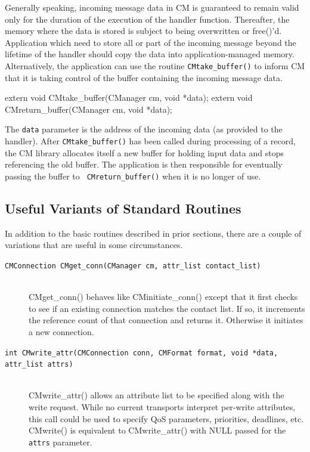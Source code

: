 \documentclass[11pt]{article}
\begin{document}
Generally speaking, incoming message data in CM is guaranteed to remain
valid only for the duration of the execution of the handler function.
Thereafter, the memory where the data is stored is subject to being
overwritten or free()'d.  Application which need to store all or part of the
incoming message beyond the lifetime of the handler should copy the
data into application-managed memory.   Alternatively, the application can
use the routine {\tt CMtake\_buffer()} to inform CM that it is taking
control of the buffer containing the incoming message data.
\begin{verbatimtab}
	extern void CMtake_buffer(CManager cm, void *data);
	extern void CMreturn_buffer(CManager cm, void *data);
\end{verbatimtab}
The {\tt data} parameter is the address of the incoming data (as provided to
the handler).  After {\tt CMtake\_buffer()} has been called during
processing of a record, the CM library allocates itself a new buffer for
holding input data and stops referencing the old buffer.  The application is
then responsible for eventually passing the buffer to {\tt
CMreturn\_buffer()} when it is no longer of use.

\subsection{Useful Variants of Standard Routines}
In addition to the basic routines described in prior sections, there are a
couple of variations that are useful in some circumstances.

\begin{description}
\item[{\tt CMConnection CMget\_conn(CManager cm, attr\_list
contact\_list)}] \ \\ CMget\_conn() behaves like CMinitiate\_conn() except that it
first checks to see if an existing connection matches the contact list.  If
so, it increments the reference count of that connection and returns it.
Otherwise it initiates a new connection.
\item[{\tt int CMwrite\_attr(CMConnection conn, CMFormat format, void
*data, attr\_list attrs)}] \ \\
CMwrite\_attr() allows an attribute list to be
specified along with the write request.  While no current transports
interpret per-write attributes, this call could be used to specify QoS
parameters, priorities, deadlines, etc.  CMwrite() is equivalent to
CMwrite\_attr() with NULL passed for the {\tt attrs} parameter.
\end{description}
\end{document}
